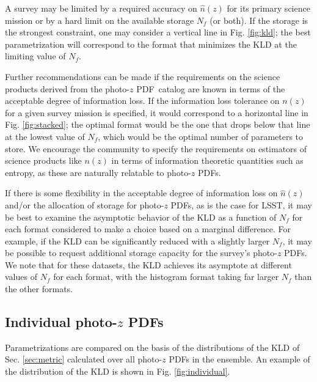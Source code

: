 \documentclass[\docopts]{\docclass}
\newcommand{\pz}{photo-$z$ PDF}
\begin{document}
A survey may be limited by a required accuracy on $\hat{n}(z)$ for its primary 
science mission or by a hard limit on the available storage $N_{f}$ (or both).  
If the storage is the strongest constraint, one may consider a vertical line in 
Fig. \ref{fig:kld}; the best parametrization will correspond to the format that 
minimizes the KLD at the limiting value of $N_{f}$.

Further recommendations can be made if the requirements on the science products 
derived from the \pz\ catalog are known in terms of the acceptable degree of 
information loss.  If the information loss tolerance on $n(z)$ for a given 
survey mission is specified, it would correspond to a horizontal line in Fig. 
\ref{fig:stacked}; the optimal format would be the one that drops below that 
line at the lowest value of $N_{f}$, which would be the optimal number of 
parameters to store.  We encourage the community to specify the requirements on 
estimators of science products like $n(z)$ in terms of information theoretic 
quantities such as entropy, as these are naturally relatable to \pz s.

If there is some flexibility in the acceptable degree of information loss on 
$\hat{n}(z)$ and/or the allocation of storage for \pz s, as is the case for 
LSST, it may be best to examine the asymptotic behavior of the KLD as a 
function of $N_{f}$ for each format considered to make a choice based on a 
marginal difference.  For example, if the KLD can be significantly reduced with 
a slightly larger $N_{f}$, it may be possible to request additional storage 
capacity for the survey's \pz s.  We note that for these datasets, the KLD 
achieves its asymptote at different values of $N_{f}$ for each format, with the 
histogram format taking far larger $N_{f}$ than the other formats.

\subsection{Individual \pz s}
\label{sec:individual_results}

Parametrizations are compared on the basis of the distributions of the KLD of 
Sec. \ref{sec:metric} calculated over all \pz s in the ensemble.  An example of 
the distribution of the KLD is shown in Fig. \ref{fig:individual}.
\end{document}
